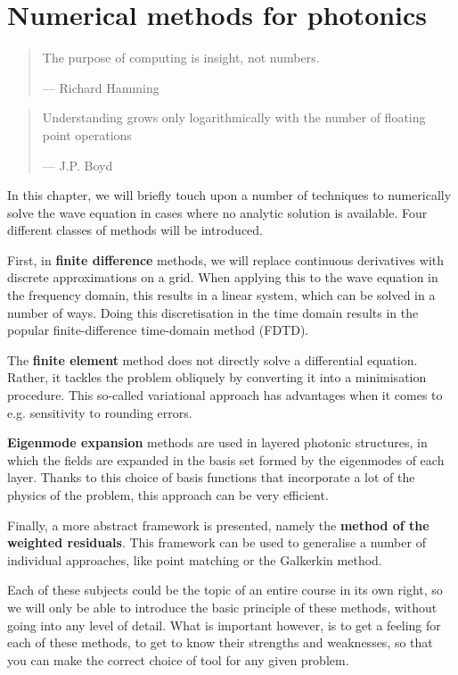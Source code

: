 \chapter{Numerical methods for photonics}
\label{h:numeric}

\begin{quote}
The purpose of computing is insight, not numbers.

--- Richard Hamming
\end{quote}

\begin{quote}
Understanding grows only logarithmically with the number of floating point operations 

--- J.P. Boyd
\end{quote}

\chaptertoc


In this chapter, we will briefly touch upon a number of techniques to numerically solve the wave equation in cases where no analytic solution is available. Four different classes of methods will be introduced.

First, in \textbf{finite difference} methods, we will replace continuous derivatives with discrete approximations on a grid. When applying this to the wave equation in the frequency domain, this results in a linear system, which can be solved in a number of ways. Doing this discretisation in the time domain results in the popular finite-difference time-domain method (FDTD).

The \textbf{finite element} method does not directly solve a differential equation. Rather, it tackles the problem obliquely by converting it into a minimisation procedure. This so-called variational approach has advantages when it comes to e.g. sensitivity to rounding errors.

\textbf{Eigenmode expansion} methods are used in layered photonic structures, in which the fields are expanded in the basis set formed by the eigenmodes of each layer. Thanks to this choice of basis functions that incorporate a lot of the physics of the problem, this approach can be very efficient.

Finally, a more abstract framework is presented, namely the \textbf{method of the weighted residuals}. This framework can be used to generalise a number of individual approaches, like point matching or the Galkerkin method.

Each of these subjects could be the topic of an entire course in its own right, so we will only be able to introduce the basic principle of these methods, without going into any level of detail. What is important however, is to get a feeling for each of these methods, to get to know their strengths and weaknesses, so that you can make the correct choice of tool for any given problem.



